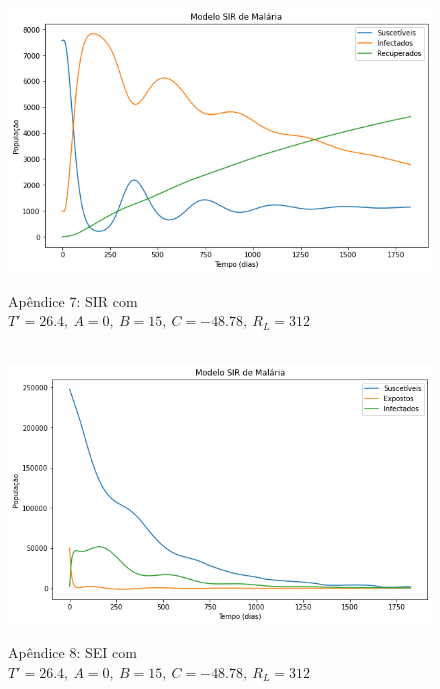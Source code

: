 \documentclass[12pt]{article}
\begin{document}
\newpage
\begin{figure}[!ht]
        \centering
        \hbox{\hspace{2.5em} \includegraphics[scale=0.55] {SIR_Correcao_b3_A0.png}}
        \caption*{Apêndice 7: SIR com $T'=26.4, \ A=0, \ B=15, \ C=-48.78, \ R_L=312$}
\end{figure} 
\begin{figure}[!ht]
        \centering
        \hbox{\hspace{2.0em} \includegraphics[scale=0.55] {SEI_Correcao_b3_A0.png}}
        \caption*{Apêndice 8: SEI com $T'=26.4, \ A=0, \ B=15, \ C=-48.78, \ R_L=312$}
\end{figure}
\newpage
\end{document}
